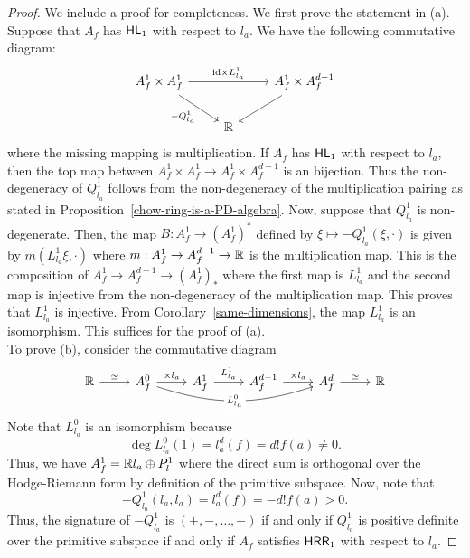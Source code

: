 \documentclass{puthesis-UG}
\begin{document}
\begin{proof}
	We include a proof for completeness. We first prove the statement in (a). Suppose that $A_f$ has $\mathsf{HL}_1$ with respect to $l_a$. We have the following commutative diagram:
	\[\begin{tikzcd}
	{A_f^1 \times A_f^1} && {A_f^1 \times A_f^{d-1}} \\
	& {\mathbb{R}}
	\arrow["{\text{id} \times L_{l_a}^1}", from=1-1, to=1-3]
	\arrow["{-Q_{l_a}^1}"', from=1-1, to=2-2]
	\arrow[from=1-3, to=2-2]
\end{tikzcd}\]
where the missing mapping is multiplication. If $A_f$ has $\mathsf{HL}_1$ with respect to $l_a$, then the top map between $A_f^1 \times A_f^1 \to A_f^1 \times A_f^{d-1}$ is an bijection. Thus the non-degeneracy of $Q_{l_a}^1$ follows from the non-degeneracy of the multiplication pairing as stated in Proposition~\ref{chow-ring-is-a-PD-algebra}. Now, suppose that $Q_{l_a}^1$ is non-degenerate. Then, the map $B : A_f^1 \to (A_f^1)^*$ defined by $\xi \mapsto -Q_{l_a}^1(\xi, \cdot)$ is given by $m(L_{l_a}^1 \xi, \cdot)$ where $m : A_f^1 \to A_f^{d-1} \to \mathbb{R}$ is the multiplication map. This is the composition of $A_f^1 \to A_f^{d-1} \to (A_f^1)_*$ where the first map is $L_{l_a}^1$ and the second map is injective from the non-degeneracy of the multiplication map. This proves that $L_{l_a}^1$ is injective. From Corollary~\ref{same-dimensions}, the map $L_{l_a}^1$ is an isomorphism. This suffices for the proof of (a). \\

To prove (b), consider the commutative diagram
\[\begin{tikzcd}
	{\mathbb{R}} & {A^0_f} & {A_f^1} & {A_f^{d-1}} & {A_f^d} & {\mathbb{R}}
	\arrow["{\times l_a}", from=1-2, to=1-3]
	\arrow["{L_{l_a}^1}", from=1-3, to=1-4]
	\arrow["{\times l_a}", from=1-4, to=1-5]
	\arrow["\simeq", from=1-1, to=1-2]
	\arrow["\simeq", from=1-5, to=1-6]
	\arrow["L_{l_a}^0"{description}, bend right= 18, from=1-2, to=1-5]
\end{tikzcd}\]
Note that $L_{l_a}^0$ is an isomorphism because 
\[
	\deg L_{l_a}^0 (1) = l_a^d (f)  = d! f(a) \neq 0.
\]
Thus, we have $A_f^1 = \mathbb{R} l_a \oplus P_l^1$ where the direct sum is orthogonal over the Hodge-Riemann form by definition of the primitive subspace. Now, note that 
\[
	-Q_{l_a}^1(l_a, l_a) = l_a^d (f) = -d! f(a) > 0. 
\]
Thus, the signature of $-Q_{l_a}^1$ is $(+, -, \ldots, -)$ if and only if $Q_{l_a}^1$ is positive definite over the primitive subspace if and only if $A_f$ satisfies $\mathsf{HRR}_1$ with respect to $l_a$. 
\end{proof}
\end{document}
